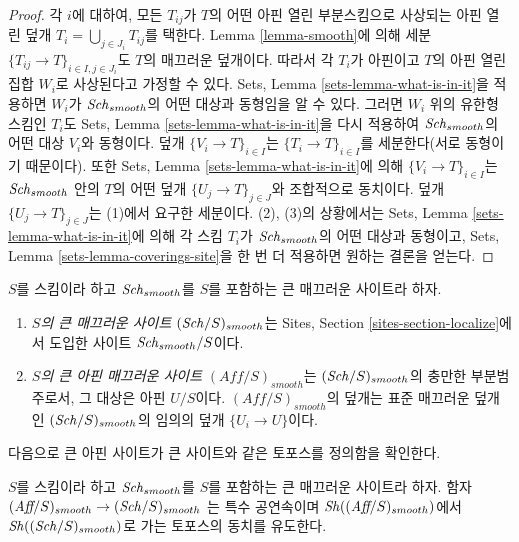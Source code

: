 \begin{proof}
각 $i$에 대하여, 모든 $T_{ij}$가 $T$의 어떤 아핀 열린 부분스킴으로
사상되는 아핀 열린 덮개
$T_i = \bigcup_{j \in J_i} T_{ij}$를 택한다. Lemma
\ref{lemma-smooth}에 의해 세분
$\{T_{ij} \to T\}_{i \in I, j \in J_i}$도 $T$의 매끄러운 덮개이다.
따라서 각 $T_i$가 아핀이고 $T$의 아핀 열린집합 $W_i$로 사상된다고
가정할 수 있다. Sets, Lemma \ref{sets-lemma-what-is-in-it}을 적용하면
$W_i$가 $\mathit{Sch}_{smooth}$의 어떤 대상과 동형임을 알 수 있다. 그러면
$W_i$ 위의 유한형 스킴인 $T_i$도 Sets, Lemma
\ref{sets-lemma-what-is-in-it}을 다시 적용하여 $\mathit{Sch}_{smooth}$의 어떤
대상 $V_i$와 동형이다. 덮개 $\{V_i \to T\}_{i \in I}$는
$\{T_i \to T\}_{i \in I}$를 세분한다(서로 동형이기 때문이다). 또한
Sets, Lemma \ref{sets-lemma-what-is-in-it}에 의해
$\{V_i \to T\}_{i \in I}$는 $\mathit{Sch}_{smooth}$ 안의 $T$의 어떤 덮개
$\{U_j \to T\}_{j \in J}$와 조합적으로 동치이다. 덮개
$\{U_j \to T\}_{j \in J}$는 (1)에서 요구한 세분이다. (2), (3)의
상황에서는 Sets, Lemma \ref{sets-lemma-what-is-in-it}에 의해 각 스킴
$T_i$가 $\mathit{Sch}_{smooth}$의 어떤 대상과 동형이고, Sets, Lemma
\ref{sets-lemma-coverings-site}을 한 번 더 적용하면 원하는 결론을 얻는다.
\end{proof}

\begin{definition}
\label{definition-big-small-smooth}
$S$를 스킴이라 하고 $\mathit{Sch}_{smooth}$를 $S$를 포함하는 큰 매끄러운
사이트라 하자.
\begin{enumerate}
\item {\it $S$의 큰 매끄러운 사이트} $(\mathit{Sch}/S)_{smooth}$는 Sites,
Section \ref{sites-section-localize}에서 도입한 사이트
$\mathit{Sch}_{smooth}/S$이다.
\item {\it $S$의 큰 아핀 매끄러운 사이트} $(\textit{Aff}/S)_{smooth}$는
$(\mathit{Sch}/S)_{smooth}$의 충만한 부분범주로서, 그 대상은 아핀 $U/S$이다.
$(\textit{Aff}/S)_{smooth}$의 덮개는 표준 매끄러운 덮개인
$(\mathit{Sch}/S)_{smooth}$의 임의의 덮개 $\{U_i \to U\}$이다.
\end{enumerate}
\end{definition}

\noindent
다음으로 큰 아핀 사이트가 큰 사이트와 같은 토포스를 정의함을
확인한다.

\begin{lemma}
\label{lemma-affine-big-site-smooth}
$S$를 스킴이라 하고 $\mathit{Sch}_{smooth}$를 $S$를 포함하는 큰 매끄러운
사이트라 하자. 함자
$(\textit{Aff}/S)_{smooth} \to (\mathit{Sch}/S)_{smooth}$
는 특수 공연속이며 $\mathop{\mathit{Sh}}\nolimits((\textit{Aff}/S)_{smooth})$에서
$\mathop{\mathit{Sh}}\nolimits((\mathit{Sch}/S)_{smooth})$로 가는 토포스의 동치를 유도한다.
\end{lemma}

